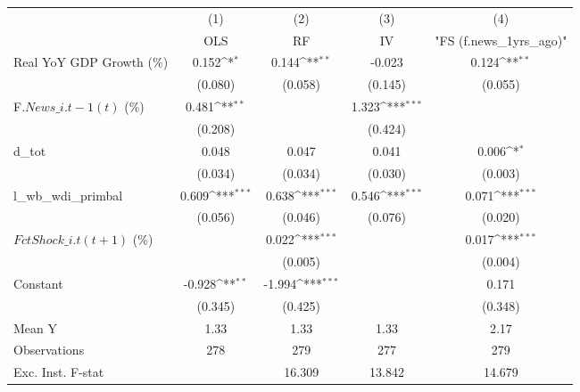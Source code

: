 {
\def\sym#1{\ifmmode^{#1}\else\(^{#1}\)\fi}
\begin{tabular}{l*{4}{c}}
\toprule
                    &\multicolumn{1}{c}{(1)}&\multicolumn{1}{c}{(2)}&\multicolumn{1}{c}{(3)}&\multicolumn{1}{c}{(4)}\\
                    &\multicolumn{1}{c}{OLS}&\multicolumn{1}{c}{RF}&\multicolumn{1}{c}{IV}&\multicolumn{1}{c}{ "FS (f.news\_1yrs\_ago)" }\\
\midrule
Real YoY GDP Growth (\%)&       0.152\sym{*}  &       0.144\sym{**} &      -0.023         &       0.124\sym{**} \\
                    &     (0.080)         &     (0.058)         &     (0.145)         &     (0.055)         \\
\addlinespace
F.$ News\_{i.t-1}(t)$ (\%)&       0.481\sym{**} &                     &       1.323\sym{***}&                     \\
                    &     (0.208)         &                     &     (0.424)         &                     \\
\addlinespace
d\_tot               &       0.048         &       0.047         &       0.041         &       0.006\sym{*}  \\
                    &     (0.034)         &     (0.034)         &     (0.030)         &     (0.003)         \\
\addlinespace
l\_wb\_wdi\_primbal    &       0.609\sym{***}&       0.638\sym{***}&       0.546\sym{***}&       0.071\sym{***}\\
                    &     (0.056)         &     (0.046)         &     (0.076)         &     (0.020)         \\
\addlinespace
$ FctShock\_{i.t}(t+1)$ (\%)&                     &       0.022\sym{***}&                     &       0.017\sym{***}\\
                    &                     &     (0.005)         &                     &     (0.004)         \\
\addlinespace
Constant            &      -0.928\sym{**} &      -1.994\sym{***}&                     &       0.171         \\
                    &     (0.345)         &     (0.425)         &                     &     (0.348)         \\
\midrule
Mean Y              &        1.33         &        1.33         &        1.33         &        2.17         \\
Observations        &         278         &         279         &         277         &         279         \\
Exc. Inst. F-stat   &                     &      16.309         &      13.842         &      14.679         \\
\bottomrule
\end{tabular}
}
